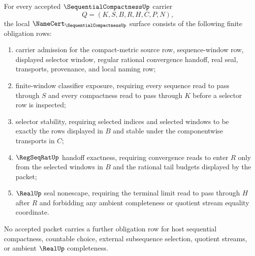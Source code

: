 \begin{theorem}
\label{thm:sequential-compactness-namecert-obligations}
For every accepted $\SequentialCompactnessUp$ carrier
$$
Q=(K,S,B,R,H,C,P,N),
$$
the local $\NameCert_{\SequentialCompactnessUp}$ surface consists of the following finite obligation rows:
\begin{enumerate}
\item carrier admission for the compact-metric source row, sequence-window row, displayed selector window, regular rational convergence handoff, real seal, transports, provenance, and local naming row;
\item finite-window classifier exposure, requiring every sequence read to pass through $S$ and every compactness read to pass through $K$ before a selector row is inspected;
\item selector stability, requiring selected indices and selected windows to be exactly the rows displayed in $B$ and stable under the componentwise transports in $C$;
\item $\RegSeqRatUp$ handoff exactness, requiring convergence reads to enter $R$ only from the selected windows in $B$ and the rational tail budgets displayed by the packet;
\item $\RealUp$ seal nonescape, requiring the terminal limit read to pass through $H$ after $R$ and forbidding any ambient completeness or quotient stream equality coordinate.
\end{enumerate}
No accepted packet carries a further obligation row for host sequential compactness, countable choice, external subsequence selection, quotient streams, or ambient $\RealUp$ completeness.
\end{theorem}
